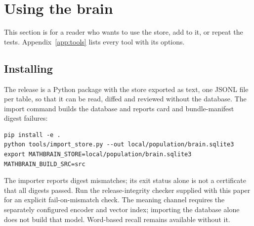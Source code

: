 \section{Using the brain}\label{sec:usage}

This section is for a reader who wants to use the store, add to it, or repeat the tests. Appendix~\ref{app:tools} lists every tool with its options.

\subsection{Installing}
The release is a Python package with the store exported as text, one JSONL file per table, so that it can be read, diffed and reviewed without the database. The import command builds the database and reports card and bundle-manifest digest failures:
\begin{verbatim}
pip install -e .
python tools/import_store.py --out local/population/brain.sqlite3
export MATHBRAIN_STORE=local/population/brain.sqlite3 MATHBRAIN_BUILD_SRC=src
\end{verbatim}
The importer reports digest mismatches; its exit status alone is not a certificate that all digests passed. Run the release-integrity checker supplied with this paper for an explicit fail-on-mismatch check. The meaning channel requires the separately configured encoder and vector index; importing the database alone does not build that model. Word-based recall remains available without it.

